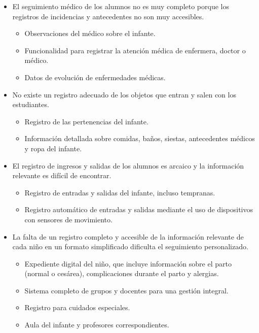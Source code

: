 \documentclass{article}
\begin{document}
\begin{itemize}

	\item El seguimiento médico de los alumnos no es muy completo porque los registros de  incidencias y antecedentes no son muy accesibles.
	      \begin{itemize}
		      \item Observaciones del médico sobre el infante.
		      \item Funcionalidad para registrar la atención médica de enfermera, doctor o médico.
		      \item Datos de evolución de enfermedades médicas.
	      \end{itemize}

	\item No existe un registro adecuado de los objetos que entran y salen con los estudiantes.
	      \begin{itemize}
		      \item Registro de las pertenencias del infante.
		      \item Información detallada sobre comidas, baños, siestas, antecedentes médicos y ropa del infante.
	      \end{itemize}

	\item El registro de ingresos y salidas de los alumnos es arcaico y la información relevante es difícil de encontrar.
	      \begin{itemize}
		      \item Registro de entradas y salidas del infante, incluso tempranas.
		      \item Registro automático de entradas y salidas mediante el uso de dispositivos con sensores de movimiento.
	      \end{itemize}

	\item La falta de un registro completo y accesible de la información relevante de cada niño en un formato simplificado dificulta el seguimiento personalizado.
	      \begin{itemize}
		      \item Expediente digital del niño, que incluye información sobre el parto (normal o cesárea), complicaciones durante el parto y alergias.
		      \item Sistema completo de grupos y docentes para una gestión integral.
		      \item Registro para cuidados especiales.
		      \item Aula del infante y profesores correspondientes.
	      \end{itemize}


\end{itemize}
\end{document}
